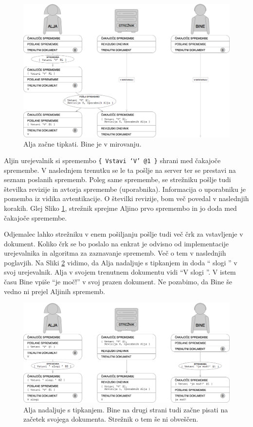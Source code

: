 \documentclass[a4paper, 12pt, twoside]{book}
\begin{document}
\begin{figure}[placement h]
\begin{center}
\includegraphics[width=14cm]{pc1.png}
\end{center}
\caption{Alja začne tipkati. Bine je v mirovanju.}
\label{pc1}
\end{figure}

Aljin urejevalnik si spremembo {\tt \{ Vstavi ‘V’ @1 \}} shrani med čakajoče spremembe. V naslednjem trenutku se le ta pošlje na server ter se prestavi na seznam poslanih sprememb. Poleg same spremembe, se strežniku pošlje tudi številka revizije in avtorja spremembe (uporabnika). Informacija o uporabniku je pomemba iz vidika avtentikacije. O številki revizije, bom več povedal v naslednjih korakih. Glej Sliko \ref{pc1}, strežnik sprejme Aljino prvo spremembo in jo doda med čakajoče spremembe.

Odjemalec lahko strežniku v enem pošiljanju pošlje tudi več črk za vstavljenje v dokument. Koliko črk se bo poslalo na enkrat je odvisno od implementacije urejevalnika in algoritma za zaznavanje sprememb. Več o tem v naslednjih poglavjih. Na Sliki \ref{pc2} vidimo, da Alja nadaljuje s tipkanjem in doda “ slogi ” v svoj urejevalnik. Alja v svojem trenutnem dokumentu vidi “V slogi ”. V istem času Bine vpiše “je moč!” v svoj prazen dokument. Ne pozabimo, da Bine še vedno ni prejel Aljinih sprememb.

\begin{figure}[placement h]
\begin{center}
\includegraphics[width=14cm]{pc2.png}
\end{center}
\caption{Alja nadaljuje s tipkanjem. Bine na drugi strani tudi začne pisati na začetek svojega dokumenta. Strežnik o tem še ni obveščen.}
\label{pc2}
\end{figure}
\end{document}
